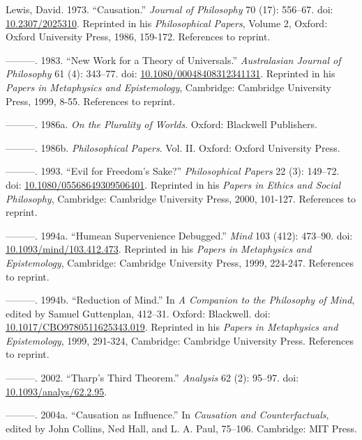 \documentclass[
  11pt,
  letterpaper,
  DIV=11,
  numbers=noendperiod,
  twoside]{scrartcl}
\newlength{\cslhangindent}
\newenvironment{CSLReferences}[2] %
 {\begin{list}{}{%
  \setlength{\itemindent}{0pt}
  \setlength{\leftmargin}{0pt}
  \setlength{\parsep}{0pt}
  \ifodd #1
   \setlength{\leftmargin}{\cslhangindent}
   \setlength{\itemindent}{-1\cslhangindent}
  \fi
  \setlength{\itemsep}{#2\baselineskip}}}
 {\end{list}}
\begin{document}
\begin{CSLReferences}{1}{0}
Lewis, David. 1973. {``Causation.''} \emph{Journal of Philosophy} 70
(17): 556--67. doi:
\href{https://doi.org/10.2307/2025310}{10.2307/2025310}. Reprinted in
his \emph{Philosophical Papers}, Volume 2, Oxford: Oxford University
Press, 1986, 159-172. References to reprint.

---------. 1983. {``New Work for a Theory of Universals.''}
\emph{Australasian Journal of Philosophy} 61 (4): 343--77. doi:
\href{https://doi.org/10.1080/00048408312341131}{10.1080/00048408312341131}.
Reprinted in his \emph{Papers in Metaphysics and Epistemology},
Cambridge: Cambridge University Press, 1999, 8-55. References to
reprint.

---------. 1986a. \emph{On the Plurality of Worlds}. Oxford: Blackwell
Publishers.

---------. 1986b. \emph{Philosophical Papers}. Vol. II. Oxford: Oxford
University Press.

---------. 1993. {``Evil for Freedom's Sake?''} \emph{Philosophical
Papers} 22 (3): 149--72. doi:
\href{https://doi.org/10.1080/05568649309506401}{10.1080/05568649309506401}.
Reprinted in his \emph{Papers in Ethics and Social Philosophy},
Cambridge: Cambridge University Press, 2000, 101-127. References to
reprint.

---------. 1994a. {``Humean Supervenience Debugged.''} \emph{Mind} 103
(412): 473--90. doi:
\href{https://doi.org/10.1093/mind/103.412.473}{10.1093/mind/103.412.473}.
Reprinted in his \emph{Papers in Metaphysics and Epistemology},
Cambridge: Cambridge University Press, 1999, 224-247. References to
reprint.

---------. 1994b. {``Reduction of Mind.''} In \emph{A Companion to the
Philosophy of Mind}, edited by Samuel Guttenplan, 412--31. Oxford:
Blackwell. doi:
\href{https://doi.org/10.1017/CBO9780511625343.019}{10.1017/CBO9780511625343.019}.
Reprinted in his \emph{Papers in Metaphysics and Epistemology}, 1999,
291-324, Cambridge: Cambridge University Press. References to reprint.

---------. 2002. {``Tharp's Third Theorem.''} \emph{Analysis} 62 (2):
95--97. doi:
\href{https://doi.org/10.1093/analys/62.2.95}{10.1093/analys/62.2.95}.

---------. 2004a. {``Causation as Influence.''} In \emph{Causation and
Counterfactuals}, edited by John Collins, Ned Hall, and L. A. Paul,
75--106. Cambridge: {MIT} Press.


\end{CSLReferences}
\end{document}
